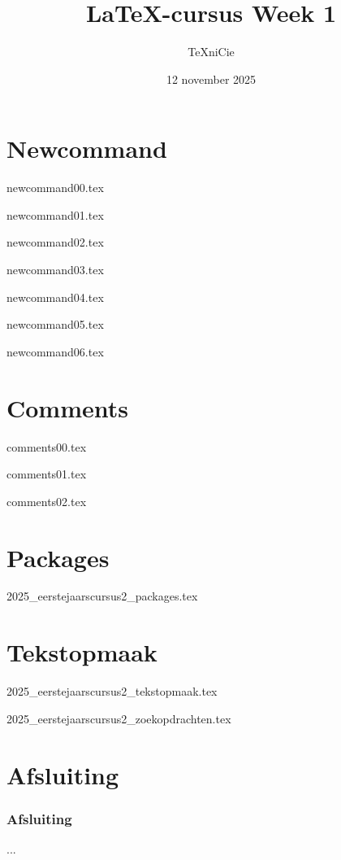 \documentclass[allauthors,dutch]{../../cursuspresentatie}
\title{\LaTeX{}-cursus Week 1}
\author{\TeX niCie}
\date{12 november 2025}
\def\importslidej#1#2{%
	{#2}
}
\def\importslidey#1#2{%
	{#2}
}
\begin{document}
\section{Newcommand}
\def\placetarget{\hypertarget{newcommand}{}}

\importslidey{2025-eerstejaars_cursus_2}{newcommand00.tex}
\importslidey{2025-eerstejaars_cursus_2}{newcommand01.tex}
\importslidey{2025-eerstejaars_cursus_2}{newcommand02.tex}
\importslidey{2025-eerstejaars_cursus_2}{newcommand03.tex}
\importslidey{2025-eerstejaars_cursus_2}{newcommand04.tex}
\importslidey{2025-eerstejaars_cursus_2}{newcommand05.tex}
\importslidey{2025-eerstejaars_cursus_2}{newcommand06.tex}

\section{Comments}
\def\placetarget{\hypertarget{comments}{}}

\importslidey{2025-eerstejaars_cursus_2}{comments00.tex}
\importslidey{2025-eerstejaars_cursus_2}{comments01.tex}
\importslidey{2025-eerstejaars_cursus_2}{comments02.tex}

\section{Packages}
\def\placetarget{\hypertarget{packages}{}}
\importslidej{cursus2}{2025_eerstejaarscursus2_packages.tex}

\section{Tekstopmaak}
\def\placetarget{\hypertarget{tekstopmaak}{}}
\importslidej{cursus2}{2025_eerstejaarscursus2_tekstopmaak.tex}
\importslidej{cursus2}{2025_eerstejaarscursus2_zoekopdrachten.tex}

\section{Afsluiting}
\begin{frame}
	\frametitle{Afsluiting}
	...
\end{frame}
	
\end{document}
